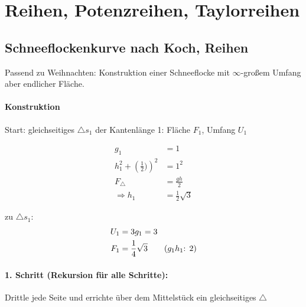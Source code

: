 
\chapter{Reihen, Potenzreihen, Taylorreihen}

\section{Schneeflockenkurve nach Koch, Reihen}

Passend zu Weihnachten: Konstruktion einer Schneeflocke mit $\infty$-großem Umfang aber endlicher Fläche.

\subsubsection*{Konstruktion}
Start: gleichseitiges $\triangle s_1$ der Kantenlänge 1: Fläche $F_1$, Umfang $U_1$

\begin{center}
\end{center}

\begin{align*}
    g_1 &= 1 \\
    h_1^2 + \left(\frac{1}{2})\right)^2 &= 1^2 \\
    F_{\triangle} &= \frac{g h}{2} \\
    \Rightarrow h_1 &= \frac{1}{2} \sqrt{3}
\end{align*}

zu $\triangle s_1$:
\begin{align*}
    U_1 &= 3 g_1 = 3 \\
    F_1 &= \frac{1}{4} \sqrt{3} \hspace{20px} \text{($g_1 h_1$: 2)}
\end{align*}

\subsubsection*{1. Schritt (Rekursion für alle Schritte):}

Drittle jede Seite und errichte über dem Mittelstück ein gleichseitiges $\triangle$


